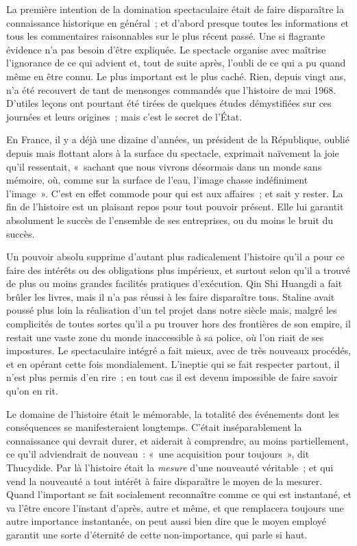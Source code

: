 \documentclass[french,twoside]{book} %
\def\bignobreak{\ifdim\lastskip<\bigskipamount
  \removelastskip\nopagebreak\bigskip\fi}
\newcommand{\labelblock}[1]{\bigbreak{\color{rubric}\noindent\textbf{#1}\par}\bignobreak}
\begin{document}
\labelblock{VI}

\noindent La première intention de la domination spectaculaire était de faire disparaître la connaissance historique en général ; et d’abord presque toutes les informations et tous les commentaires raisonnables sur le plus récent passé. Une si flagrante évidence n’a pas besoin d’être expliquée. Le spectacle organise avec maîtrise l’ignorance de ce qui advient et, tout de suite après, l’oubli de ce qui a pu quand même en être connu. Le plus important est le plus caché. Rien, depuis vingt ans, n’a été recouvert de tant de mensonges commandés que l’histoire de mai 1968. D’utiles leçons ont pourtant été tirées de quelques études démystifiées sur ces journées et leurs origines ; mais c’est le secret de l’État.\par
En France, il y a déjà une dizaine d’années, un président de la République, oublié depuis mais flottant alors à la surface du spectacle, exprimait naïvement la joie qu’il ressentait, « sachant que nous vivrons désormais dans un monde sans mémoire, où, comme sur la surface de l’eau, l’image chasse indéfiniment l’image ». C’est en effet commode pour qui est aux affaires ; et sait y rester. La fin de l’histoire est un plaisant repos pour tout pouvoir présent. Elle lui garantit absolument le succès de l’ensemble de ses entreprises, ou du moins le bruit du succès.\par
Un pouvoir absolu supprime d’autant plus radicalement l’histoire qu’il a pour ce faire des intérêts ou des obligations plus impérieux, et surtout selon qu’il a trouvé de plus ou moins grandes facilités pratiques d’exécution. Qin Shi Huangdi a fait brûler les livres, mais il n’a pas réussi à les faire disparaître tous. Staline avait poussé plus loin la réalisation d’un tel projet dans notre siècle mais, malgré les complicités de toutes sortes qu’il a pu trouver hors des frontières de son empire, il restait une vaste zone du monde inaccessible à sa police, où l’on riait de ses impostures. Le spectaculaire intégré a fait mieux, avec de très nouveaux procédés, et en opérant cette fois mondialement. L’ineptie qui se fait respecter partout, il n’est plus permis d’en rire ; en tout cas il est devenu impossible de faire savoir qu’on en rit.\par
Le domaine de l’histoire était le mémorable, la totalité des événements dont les conséquences se manifesteraient longtemps. C’était inséparablement la connaissance qui devrait durer, et aiderait à comprendre, au moins partiellement, ce qu’il adviendrait de nouveau : « une acquisition pour toujours », dit Thucydide. Par là l’histoire était la \emph{mesure} d’une nouveauté véritable ; et qui vend la nouveauté a tout intérêt à faire disparaître le moyen de la mesurer. Quand l’important se fait socialement reconnaître comme ce qui est instantané, et va l’être encore l’instant d’après, autre et même, et que remplacera toujours une autre importance instantanée, on peut aussi bien dire que le moyen employé garantit une sorte d’éternité de cette non-importance, qui parle si haut.\par
\end{document}
